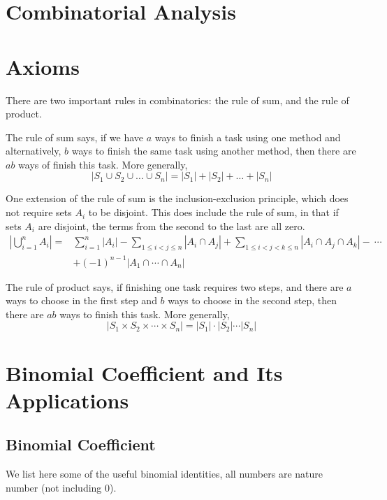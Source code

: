 \section{Combinatorial Analysis}
\section{Axioms}
There are two important rules in combinatorics: the rule of sum, and the rule of product.

The rule of sum says, if we have $a$ ways to finish a task using one method and alternatively, $b$ ways to finish the same task using another method, then there are $ab$ ways of finish this task. More generally,
\begin{equation}
	|S_1 \cup S_2 \cup \ldots \cup S_n| = |S_1| + |S_2| + \ldots + |S_n|
\end{equation}

One extension of the rule of sum is the inclusion-exclusion principle, which does not require sets $A_i$ to be disjoint. This does include the rule of sum, in that if sets $A_i$ are disjoint, the terms from the second to the last are all zero.
\begin{equation}
\begin{split}
|\bigcup_{i=1}^n A_i| = & \sum_{i=1}^n|A_i| - \sum_{1 \le i < j \le n}|A_i\cap A_j| + \sum_{1 \le i < j < k \le n}|A_i\cap A_j\cap A_k|-\ \cdots\ \\
&  +  \left(-1\right)^{n-1} |A_1\cap\cdots\cap A_n|
\end{split}
\end{equation}

The rule of product says, if finishing one task requires two steps, and there are $a$ ways to choose in the first step and $b$ ways to choose in the second step, then there are $ab$ ways to finish this task. More generally,
\begin{equation}
|S_1 \times S_2 \times \cdots \times S_n| = |S_{1}| \cdot |S_{2}| \cdots |S_{n}|
\end{equation}

\section{Binomial Coefficient and Its Applications}
\subsection{Binomial Coefficient}
We list here some of the useful binomial identities, all numbers are nature number (not including 0).

